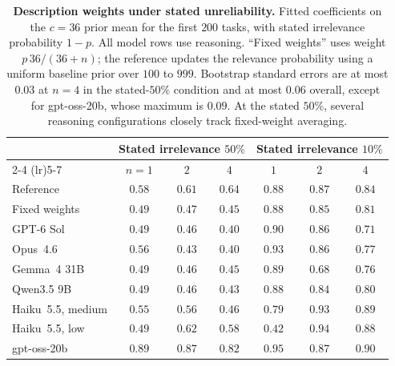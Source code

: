 \begin{table}[htbp]
\centering\small
\setlength{\tabcolsep}{3pt}
\caption[Description weights under stated unreliability]{\textbf{Description weights under stated unreliability.} Fitted coefficients on the $c=36$ prior mean for the first $200$ tasks, with stated irrelevance probability $1-p$. All model rows use reasoning. ``Fixed weights'' uses weight $p\,36/(36+n)$; the reference updates the relevance probability using a uniform baseline prior over $100$ to $999$. Bootstrap standard errors are at most $0.03$ at $n=4$ in the stated-$50\%$ condition and at most $0.06$ overall, except for gpt-oss-20b, whose maximum is $0.09$. At the stated $50\%$, several reasoning configurations closely track fixed-weight averaging.}
\label{tab:hedge}
\vspace{3pt}
\begin{tabular}{lcccccc}
\toprule
& \multicolumn{3}{c}{Stated irrelevance $50\%$} & \multicolumn{3}{c}{Stated irrelevance $10\%$} \\
\cmidrule(lr){2-4} \cmidrule(lr){5-7}
& $n=1$ & $2$ & $4$ & $1$ & $2$ & $4$ \\
\midrule
Reference & $0.58$ & $0.61$ & $0.64$ & $0.88$ & $0.87$ & $0.84$ \\
Fixed weights &$0.49$ & $0.47$ & $0.45$ & $0.88$ & $0.85$ & $0.81$ \\
\midrule
GPT-6 Sol & $0.49$ & $0.46$ & $0.40$ & $0.90$ & $0.86$ & $0.71$ \\
Opus~4.6 & $0.56$ & $0.43$ & $0.40$ & $0.93$ & $0.86$ & $0.77$ \\
Gemma~4 31B & $0.49$ & $0.46$ & $0.45$ & $0.89$ & $0.68$ & $0.76$ \\
Qwen3.5 9B & $0.49$ & $0.46$ & $0.43$ & $0.88$ & $0.84$ & $0.80$ \\
Haiku~5.5, medium & $0.55$ & $0.56$ & $0.46$ & $0.79$ & $0.93$ & $0.89$ \\
Haiku~5.5, low & $0.49$ & $0.62$ & $0.58$ & $0.42$ & $0.94$ & $0.88$ \\
gpt-oss-20b & $0.89$ & $0.87$ & $0.82$ & $0.95$ & $0.87$ & $0.90$ \\
\bottomrule
\end{tabular}
\end{table}

